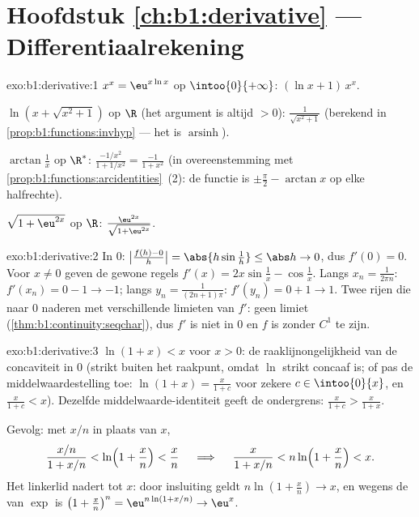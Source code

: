 \section*{Hoofdstuk \ref{ch:b1:derivative} --- Differentiaalrekening}

\begin{solution}{exo:b1:derivative:1}
$x^x = \eu^{x\ln x}$ op $\intoo{0}{+\infty}$:  $(\ln x +
1)\,x^x$.

$\ln(x + \sqrt{x^2+1})$ op $\R$ (het argument is altijd $> 0$):
 $\frac{1}{\sqrt{x^2+1}}$ (berekend in
\cref{prop:b1:functions:invhyp} --- het is
$\operatorname{arsinh}$).

$\arctan\frac1x$ op $\R^*$:  $\frac{-1/x^2}{1 + 1/x^2} =
\frac{-1}{1 + x^2}$ (in overeenstemming met
\cref{prop:b1:functions:arcidentities}~(2): de functie is
$\pm\frac\pi2 - \arctan x$ op elke halfrechte).

$\sqrt{1 + \eu^{2x}}$ op $\R$: 
$\frac{\eu^{2x}}{\sqrt{1 + \eu^{2x}}}$.
\end{solution}

\begin{solution}{exo:b1:derivative:2}
In $0$: $\bigl|\frac{f(h) - 0}{h}\bigr| = \abs{h \sin\frac1h} \leq
\abs h \to 0$, dus $f'(0) = 0$. Voor $x \neq 0$ geven de gewone
regels $f'(x) = 2x\sin\frac1x - \cos\frac1x$. Langs $x_n =
\frac{1}{2\pi n}$: $f'(x_n) = 0 - 1 \to -1$; langs $y_n =
\frac{1}{(2n+1)\pi}$: $f'(y_n) = 0 + 1 \to 1$. Twee rijen die naar
$0$ naderen met verschillende limieten van $f'$: geen limiet
(\cref{thm:b1:continuity:seqchar}), dus $f'$ is niet  in $0$
en $f$ is  zonder $C^1$ te zijn.
\end{solution}

\begin{solution}{exo:b1:derivative:3}
$\ln(1+x) < x$ voor $x > 0$: de raaklijnongelijkheid van de
concaviteit in $0$ (strikt buiten het raakpunt, omdat $\ln$ strikt
concaaf is; of pas de middelwaardestelling toe: $\ln(1+x) =
\frac{x}{1+c}$ voor zekere $c \in \intoo{0}{x}$, en $\frac{x}{1+c} <
x$). Dezelfde middelwaarde-identiteit geeft de ondergrens:
$\frac{x}{1+c} > \frac{x}{1+x}$.

Gevolg: met $x/n$ in plaats van $x$,
\[
\frac{x/n}{1 + x/n} < \ln\Bigl(1 + \frac xn\Bigr) < \frac xn
\quad\implies\quad
\frac{x}{1 + x/n} < n \ln\Bigl(1 + \frac xn\Bigr) < x .
\]
Het linkerlid nadert tot $x$: door insluiting geldt $n\ln(1 + \frac
xn) \to x$, en wegens de  van $\exp$ is $\bigl(1 +
\frac xn\bigr)^n = \eu^{n\ln(1 + x/n)} \to \eu^x$.
\end{solution}


